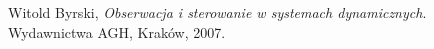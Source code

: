 \begin{thebibliography}{}
	
	
%

  Witold Byrski,
  \emph{Obserwacja i sterowanie w systemach dynamicznych}.
  Wydawnictwa AGH, Kraków, 2007.	
	
\end{thebibliography}